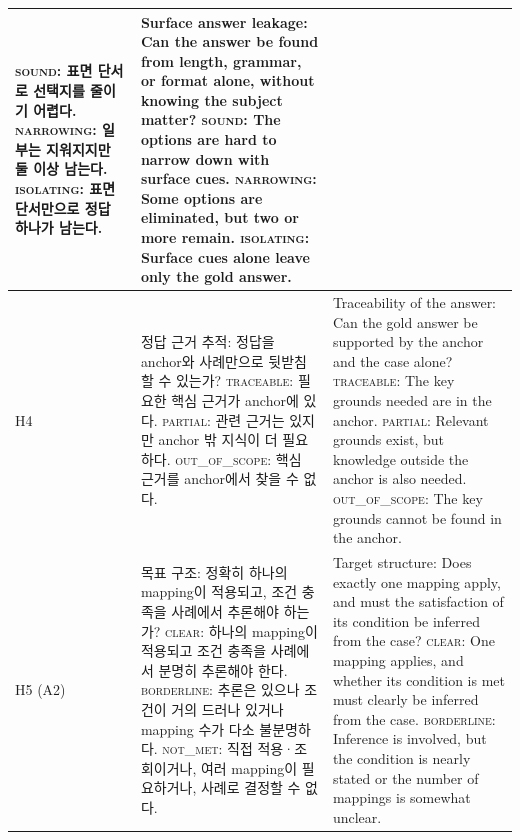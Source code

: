 \begin{table}[t]
\begin{tabular}{@{}p{}p{}p{}@{}}
\newline \textsc{sound}: 표면 단서로 선택지를 줄이기 어렵다.
\newline \textsc{narrowing}: 일부는 지워지지만 둘 이상 남는다.
\newline \textsc{isolating}: 표면 단서만으로 정답 하나가 남는다.
& Surface answer leakage: Can the answer be found from length, grammar, or format alone, without knowing the subject matter?
\newline \textsc{sound}: The options are hard to narrow down with surface cues.
\newline \textsc{narrowing}: Some options are eliminated, but two or more remain.
\newline \textsc{isolating}: Surface cues alone leave only the gold answer. \\
\midrule
H4
& 정답 근거 추적: 정답을 anchor와 사례만으로 뒷받침할 수 있는가?
\newline \textsc{traceable}: 필요한 핵심 근거가 anchor에 있다.
\newline \textsc{partial}: 관련 근거는 있지만 anchor 밖 지식이 더 필요하다.
\newline \textsc{out\_of\_scope}: 핵심 근거를 anchor에서 찾을 수 없다.
& Traceability of the answer: Can the gold answer be supported by the anchor and the case alone?
\newline \textsc{traceable}: The key grounds needed are in the anchor.
\newline \textsc{partial}: Relevant grounds exist, but knowledge outside the anchor is also needed.
\newline \textsc{out\_of\_scope}: The key grounds cannot be found in the anchor. \\
\midrule
H5 (A2)
& 목표 구조: 정확히 하나의 mapping이 적용되고, 조건 충족을 사례에서 추론해야 하는가?
\newline \textsc{clear}: 하나의 mapping이 적용되고 조건 충족을 사례에서 분명히 추론해야 한다.
\newline \textsc{borderline}: 추론은 있으나 조건이 거의 드러나 있거나 mapping 수가 다소 불분명하다.
\newline \textsc{not\_met}: 직접 적용·조회이거나, 여러 mapping이 필요하거나, 사례로 결정할 수 없다.
& Target structure: Does exactly one mapping apply, and must the satisfaction of its condition be inferred from the case?
\newline \textsc{clear}: One mapping applies, and whether its condition is met must clearly be inferred from the case.
\newline \textsc{borderline}: Inference is involved, but the condition is nearly stated or the number of mappings is somewhat unclear.

\end{tabular}
\end{table}
